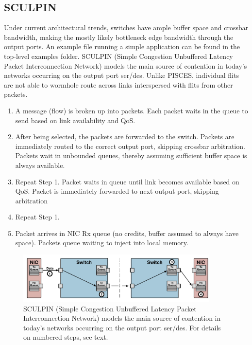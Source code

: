 \subsection{SCULPIN}
Under current architectural trends, switches have ample buffer space and crossbar bandwidth, making the mostly likely bottleneck edge bandwidth through the output ports.
An example file running a simple application can be found in the top-level examples folder.
SCULPIN (Simple Congestion Unbuffered Latency Packet Interconnection Network) models the main source of contention in today's networks occurring on the output port ser/des. Unlike PISCES, individual flits are not able to wormhole route across links interspersed with flits from other packets.
\begin{enumerate}
\item A message (flow) is broken up into packets. Each packet waits in the queue to send based on link availability and QoS.
\item After being selected, the packets are forwarded to the switch. Packets are immediately routed to the correct output port, skipping crossbar arbitration. Packets wait in unbounded queues, thereby assuming sufficient buffer space is always available.
\item Repeat Step 1. Packet waits in queue until link becomes available based on QoS. Packet is immediately forwarded to next output port, skipping arbitration
\item Repeat Step 1.
\item Packet arrives in NIC Rx queue (no credits, buffer assumed to always have space). Packets queue waiting to inject into local memory.
\end{enumerate}

\begin{figure}
\centering
\includegraphics[width=0.9\textwidth]{figures/sculpin.pdf}
\caption[SCULPIN model]{SCULPIN (Simple Congestion Unbuffered Latency Packet Interconnection Network) models the main source of contention in today's networks occurring on the output port ser/des. For details on numbered steps, see text.}
\label{fig:sculpin}
\end{figure}

